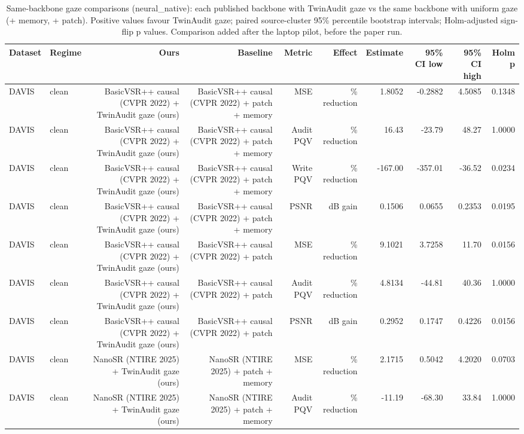 \begin{table}[t]
\centering
\caption{Same-backbone gaze comparisons (neural\_native): each published backbone with TwinAudit gaze vs the same backbone with uniform gaze (+ memory, + patch). Positive values favour TwinAudit gaze; paired source-cluster 95\% percentile bootstrap intervals; Holm-adjusted sign-flip p values. Comparison added after the laptop pilot, before the paper run.}
\label{tab:backbone_gaze_neural_native}
\small
\begin{tabular}{llrrrrrrrr}
\toprule
Dataset & Regime & Ours & Baseline & Metric & Effect & Estimate & 95\% CI low & 95\% CI high & Holm p \\
\midrule
DAVIS & clean & BasicVSR++ causal (CVPR 2022) + TwinAudit gaze (ours) & BasicVSR++ causal (CVPR 2022) + patch + memory & MSE & \% reduction & 1.8052 & -0.2882 & 4.5085 & 0.1348 \\
DAVIS & clean & BasicVSR++ causal (CVPR 2022) + TwinAudit gaze (ours) & BasicVSR++ causal (CVPR 2022) + patch + memory & Audit PQV & \% reduction & 16.43 & -23.79 & 48.27 & 1.0000 \\
DAVIS & clean & BasicVSR++ causal (CVPR 2022) + TwinAudit gaze (ours) & BasicVSR++ causal (CVPR 2022) + patch + memory & Write PQV & \% reduction & -167.00 & -357.01 & -36.52 & 0.0234 \\
DAVIS & clean & BasicVSR++ causal (CVPR 2022) + TwinAudit gaze (ours) & BasicVSR++ causal (CVPR 2022) + patch + memory & PSNR & dB gain & 0.1506 & 0.0655 & 0.2353 & 0.0195 \\
DAVIS & clean & BasicVSR++ causal (CVPR 2022) + TwinAudit gaze (ours) & BasicVSR++ causal (CVPR 2022) + patch & MSE & \% reduction & 9.1021 & 3.7258 & 11.70 & 0.0156 \\
DAVIS & clean & BasicVSR++ causal (CVPR 2022) + TwinAudit gaze (ours) & BasicVSR++ causal (CVPR 2022) + patch & Audit PQV & \% reduction & 4.8134 & -44.81 & 40.36 & 1.0000 \\
DAVIS & clean & BasicVSR++ causal (CVPR 2022) + TwinAudit gaze (ours) & BasicVSR++ causal (CVPR 2022) + patch & PSNR & dB gain & 0.2952 & 0.1747 & 0.4226 & 0.0156 \\
DAVIS & clean & NanoSR (NTIRE 2025) + TwinAudit gaze (ours) & NanoSR (NTIRE 2025) + patch + memory & MSE & \% reduction & 2.1715 & 0.5042 & 4.2020 & 0.0703 \\
DAVIS & clean & NanoSR (NTIRE 2025) + TwinAudit gaze (ours) & NanoSR (NTIRE 2025) + patch + memory & Audit PQV & \% reduction & -11.19 & -68.30 & 33.84 & 1.0000 \\

\end{tabular}
\end{table}

